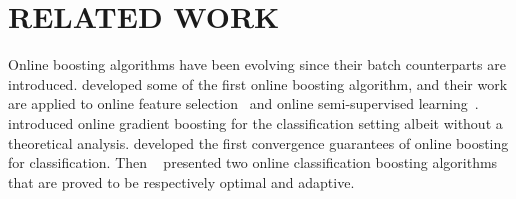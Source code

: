 

\section{RELATED WORK}
\label{sec:sgb_background}


Online boosting algorithms have been evolving since their batch counterparts are introduced. \cite{Oza01onlinebagging} developed some of the first online boosting algorithm, and their work are applied to online feature selection~\citep{grabner:2006} and online semi-supervised learning~\citep{grabner:2008}. 
\cite{leistner:2009} introduced online gradient boosting for the classification setting albeit without a theoretical analysis. \cite{lu:2012} developed the first convergence guarantees of online boosting for classification. Then ~\cite{beygelzimer2015optimal} presented two online classification boosting algorithms that are proved to be respectively optimal and adaptive. 

